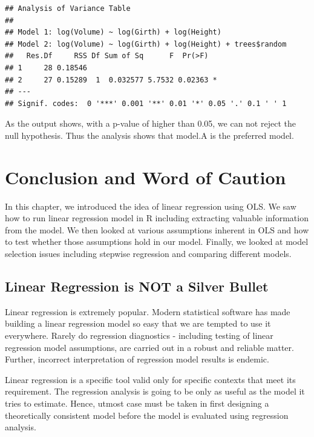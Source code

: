 \documentclass[11pt, letterpaper, twoside]{memoir}\usepackage{knitr}
\begin{document}
\begin{knitrout}
\color{fgcolor}\begin{kframe}
\begin{alltt}
\end{alltt}
\begin{verbatim}
## Analysis of Variance Table
## 
## Model 1: log(Volume) ~ log(Girth) + log(Height)
## Model 2: log(Volume) ~ log(Girth) + log(Height) + trees$random
##   Res.Df     RSS Df Sum of Sq      F  Pr(>F)  
## 1     28 0.18546                              
## 2     27 0.15289  1  0.032577 5.7532 0.02363 *
## ---
## Signif. codes:  0 '***' 0.001 '**' 0.01 '*' 0.05 '.' 0.1 ' ' 1
\end{verbatim}
\end{kframe}
\end{knitrout}

As the output shows, with a p-value of higher than 0.05, we can not reject the null hypothesis. Thus the analysis shows that model.A is the preferred model.


\section{Conclusion and Word of Caution}

In this chapter, we introduced the idea of linear regression using OLS. We saw how to run linear regression model in R including extracting valuable information from the model. We then looked at various assumptions inherent in  OLS and how to test whether those assumptions hold in our model. Finally, we looked at model selection issues including stepwise regression and comparing different models.

\subsection{Linear Regression is NOT a Silver Bullet}

Linear regression is extremely popular. Modern statistical software has made building a linear regression model so easy that we are tempted to use it everywhere. Rarely do regression diagnostics - including testing of linear regression model assumptions, are carried out in a robust and reliable matter. Further, incorrect interpretation of regression model results is endemic. 

Linear regression is a specific tool valid only for specific contexts that meet its requirement. The regression analysis is going to be only as useful as the model it tries to estimate. Hence, utmost case must be taken in first designing a theoretically consistent model before the model is evaluated using regression analysis.
\end{document}
